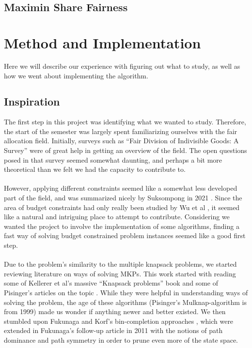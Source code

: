 \documentclass[b5paper]{article}
\begin{document}
\subsection{Maximin Share Fairness}


\section{Method and Implementation}
Here we will describe our experience with figuring out what to study, as well as how we went about implementing the algorithm.

\subsection{Inspiration}
The first step in this project was identifying what we wanted to study. Therefore, the start of the semester was largely spent familiarizing ourselves with the fair allocation field.
Initially, surveys such as ``Fair Division of Indivisible Goods: A Survey''\cite{amanatidis_fair_2022} were of great help in getting an overview of the field.
The open questions posed in that survey seemed somewhat daunting, and perhaps a bit more theoretical than we felt we had the capacity to contribute to.
\\ \\
However, applying different constraints seemed like a somewhat less developed part of the field, and was summarized nicely by Suksompong in 2021 \cite{suksompong_constraints_2021}.
Since the area of budget constraints had only really been studied by Wu et al \cite{wu_budget-feasible_2020}, it seemed like a natural and intriguing place to attempt to contribute.
Considering we wanted the project to involve the implementation of some algorithms, finding a fast way of solving budget constrained problem instances seemed like a good first step.
\\ \\
Due to the problem's similarity to the multiple knapsack problems, we started reviewing literature on ways of solving MKPs.
This work started with reading some of Kellerer et al's massive ``Knapsack problems'' book \cite{kellerer_knapsack_2004} and some of Pisinger's articles on the topic \cite{pisinger_exact_nodate}.
While they were helpful in understanding ways of solving the problem, the age of these algorithms (Pisinger's Mulknap-algorithm is from 1999) made us wonder if anything newer and better existed.
We then stumbled upon Fukunaga and Korf's bin-completion approaches \cite{fukunaga_bin_2007}, which were extended in Fukunaga's follow-up article in 2011 \cite{fukunaga_branch-and-bound_2011} with the notions of path dominance and path symmetry in order to prune even more of the state space.
\end{document}
